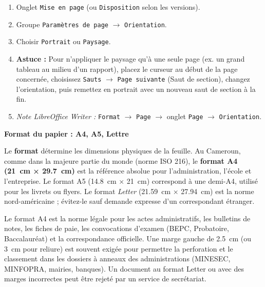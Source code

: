 \documentclass[11pt]{article}
\begin{document}
\begin{methode}
    \begin{enumerate}
        \item Onglet \texttt{Mise en page} (ou \texttt{Disposition} selon les versions).
        \item Groupe \texttt{Paramètres de page} $\rightarrow$ \texttt{Orientation}.
        \item Choisir \texttt{Portrait} ou \texttt{Paysage}.
        \item \textbf{Astuce :} Pour n'appliquer le paysage qu'à une seule page (ex. un grand tableau au milieu d'un rapport), placez le curseur au début de la page concernée, choisissez \texttt{Sauts} $\rightarrow$ \texttt{Page suivante} (Saut de section), changez l'orientation, puis remettez en portrait avec un nouveau saut de section à la fin.
        \item \textit{Note LibreOffice Writer :} \texttt{Format} $\rightarrow$ \texttt{Page} $\rightarrow$ onglet \texttt{Page} $\rightarrow$ \texttt{Orientation}.
    \end{enumerate}
\end{methode}

\textbf{Format du papier : A4, A5, Lettre}\par

Le \textbf{format} détermine les dimensions physiques de la feuille. Au Cameroun, comme dans la majeure partie du monde (norme ISO 216), le \textbf{format A4 (\SI{21}{\centi\meter} × \SI{29,7}{\centi\meter})} est la référence absolue pour l'administration, l'école et l'entreprise. Le format A5 (\SI{14,8}{\centi\meter} × \SI{21}{\centi\meter}) correspond à une demi-A4, utilisé pour les livrets ou flyers. Le format \emph{Letter} (\SI{21,59}{\centi\meter} × \SI{27,94}{\centi\meter}) est la norme nord-américaine ; évitez-le sauf demande expresse d'un correspondant étranger.

\begin{savaistu}
    Le format A4 est la norme légale pour les actes administratifs, les bulletins de notes, les fiches de paie, les convocations d'examen (BEPC, Probatoire, Baccalauréat) et la correspondance officielle. Une marge gauche de \SI{2,5}{\centi\meter} (ou \SI{3}{\centi\meter} pour reliure) est souvent exigée pour permettre la perforation et le classement dans les dossiers à anneaux des administrations (MINESEC, MINFOPRA, mairies, banques). Un document au format Letter ou avec des marges incorrectes peut être rejeté par un service de secrétariat.
\end{savaistu}
\end{document}
